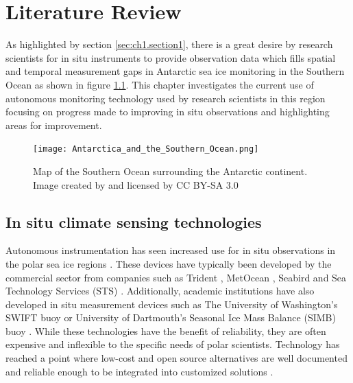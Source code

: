 
\chapter{Literature Review}
\label{ch:chapter2}
As highlighted by section \ref{sec:ch1.section1}, there is a great desire by research scientists for in situ instruments to provide observation data which fills spatial and temporal measurement gaps in Antarctic sea ice monitoring in the Southern Ocean as shown in figure \ref{fig:Antarctica_Southern_Ocean}. This chapter investigates the current use of autonomous monitoring technology used by research scientists in this region focusing on progress made to improving in situ observations and highlighting areas for improvement.

\begin{figure}[H]
	\centering
	\texttt{[image: Antarctica\_and\_the\_Southern\_Ocean.png]}
	\caption{Map of the Southern Ocean surrounding the Antarctic continent. Image created by \textcite{Hogweed2015Ocean} and licensed by CC BY-SA 3.0}
	\label{fig:Antarctica_Southern_Ocean}
\end{figure}



\newpage
\section{In situ climate sensing technologies}

Autonomous instrumentation has seen increased use for in situ observations in the polar sea ice regions \cite{kennicutt2016delivering}. These devices have typically  been developed by the commercial sector \cite{rabault2017measurements} from companies such as Trident \cite{trident}, MetOcean \cite{uptempo}, Seabird \cite{seabird2021website} and Sea Technology Services (STS) \cite{sts2021website}. Additionally, academic institutions have also developed in situ measurement devices such as The University of Washington's SWIFT buoy \cite{thomson2012wave} or University of Dartmouth's Seasonal Ice Mass Balance (SIMB) buoy \cite{polashenski2011seasonal}. While these technologies have the benefit of reliability, they are often expensive \cite{rabault2017measurements} and inflexible to the specific needs of polar scientists. Technology has reached a point where low-cost and open source alternatives are well documented and reliable enough to be integrated into customized solutions \cite{rabault2019open}.\par 


